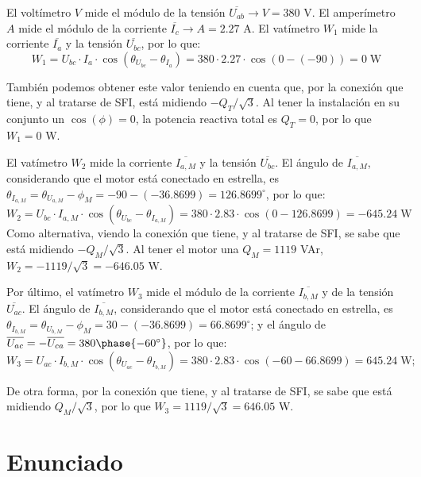 El voltímetro $V$ mide el módulo de la tensión
$\overline{U_{ab}}\rightarrow V={380}$ {V}. El amperímetro $A$ mide el
módulo de la corriente $\overline{I_c}\rightarrow A={2.27}$ {A}. El
vatímetro $W_1$ mide la corriente $\overline{I_a}$ y la tensión
$\overline{U_{bc}}$, por lo que:
\begin{equation*}
  W_1=U_{bc}\cdot I_a\cdot \cos{(\theta_{{U}_{bc}}-\theta_{{I}_a})}= 380\cdot 2.27\cdot \cos(0-(-90))={0\;\text{W}}
\end{equation*}

También podemos obtener este valor teniendo en cuenta que, por la
conexión que tiene, y al tratarse de SFI, está midiendo
$-Q_T/\sqrt{3}$. Al tener la instalación en su conjunto un
$\cos(\phi)=0$, la potencia reactiva total es $Q_T=0$, por lo que
$W_1=0$ W.
  
El vatímetro $W_2$ mide la corriente $\overline{I_{a,M}}$ y la tensión
$\overline{U_{bc}}$. El ángulo de $\overline{I_{a,M}}$, considerando
que el motor está conectado en estrella, es
$\theta_{I_{a,M}}=\theta_{U_{a,M}}-\phi_M=-90-(-36.8699)=126.8699^\circ$,
por lo que:
\begin{equation*}
  W_2=U_{bc}\cdot I_{a,M}\cdot \cos{(\theta_{{U}_{bc}}-\theta_{{I}_{a,M}})}= 380\cdot 2.83\cdot \cos(0-126.8699)={-645.24\;\text{W}}
\end{equation*}
Como alternativa, viendo la conexión que tiene, y al tratarse de SFI,
se sabe que está midiendo $-Q_M/\sqrt{3}$. Al tener el motor una
$Q_M=1119$ VAr, $W_2=-1119/\sqrt{3}=-646.05$ W.
  
Por último, el vatímetro $W_3$ mide el módulo de la corriente
$\overline{I_{b,M}}$ y de la tensión $\overline{U_{ac}}$. El ángulo de
$\overline{I_{b,M}}$, considerando que el motor está conectado en
estrella, es
$\theta_{I_{b,M}}=\theta_{U_{b,M}}-\phi_M=30-(-36.8699)=66.8699^\circ$;
y el ángulo de
$\overline{U_{ac}}=-\overline{U_{ca}}=380\phase{-60^\circ}$, por lo
que:
\begin{equation*}
  W_3=U_{ac}\cdot I_{b,M}\cdot \cos{(\theta_{{U}_{ac}}-\theta_{{I}_{b,M}})}= 380\cdot 2.83\cdot \cos(-60-66.8699)={645.24\;\text{W;}}
\end{equation*}

De otra forma, por la conexión que tiene, y al tratarse de SFI, se
sabe que está midiendo $Q_M/\sqrt{3}$, por lo que
$W_3=1119/\sqrt{3}=646.05$ W.


 \section{Enunciado}

